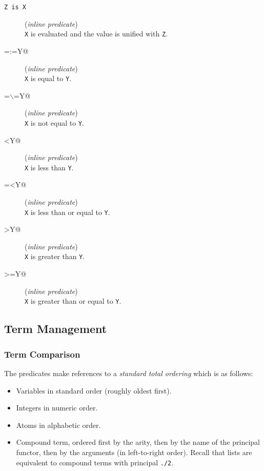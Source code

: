 \begin{description}

\item [{\tt Z is X}] ({\em inline predicate})~\\
	{\tt X} is evaluated and the value is unified with {\tt Z}.

\item [{\verb@X=:=Y@}] ({\em inline predicate})~\\
	{\tt X} is equal to {\tt Y}.

\item [{\verb@X=$\backslash$=Y@}] ({\em inline predicate})~\\
	 {\tt X} is not equal to {\tt Y}.

\item [{\verb@X<Y@}] ({\em inline predicate})~\\
	{\tt X} is less than {\tt Y}.

\item [{\verb@X=<Y@}] ({\em inline predicate})~\\
	{\tt X} is less than or equal to {\tt Y}.

\item [{\verb@X>Y@}] ({\em inline predicate})~\\
	{\tt X} is greater than {\tt Y}.

\item [{\verb@X>=Y@}] ({\em inline predicate})~\\
	{\tt X} is greater than or equal to {\tt Y}.

\end{description}




\subsection{Term Management}

\subsubsection{Term Comparison}
\label{term-comparison}

The predicates make references to a {\em standard total ordering} which
is as follows:

\begin{itemize}

\item Variables in standard order (roughly oldest first).

\item Integers in numeric order.

\item Atoms in alphabetic order.

\item Compound term, ordered first by the arity, then by
the name of the principal functor, then by the arguments (in
left-to-right order). Recall that lists are equivalent to compound
terms with principal {\tt ./2}.


\end{itemize}

